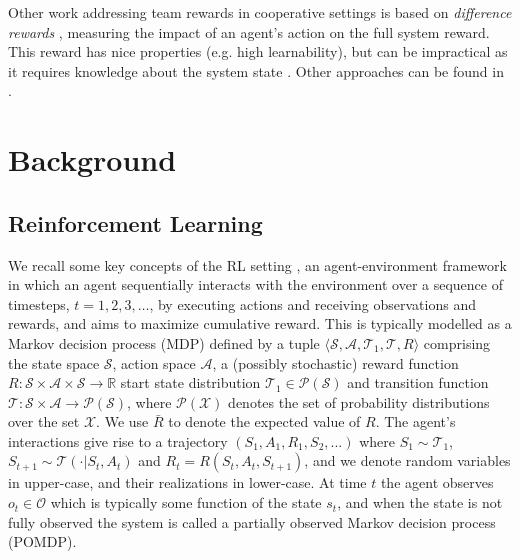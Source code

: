 \documentclass{article}
\begin{document}
Other work addressing team rewards in cooperative  settings is based on \textit{difference rewards} \citep{tumer-wolpert_cdcs04}, measuring the impact of an agent's action on the full system reward. This reward has nice properties (e.g. high learnability), but can be impractical as it requires knowledge about the system state \citep{tumer-colby_aamas16,tumer-agogino_jaamas08,tumer-proper_aamas12}. Other approaches can be found in \citet{tumer-devlin_aamas14,tumer-holmesparker_ker14,BabesCL08}.





\section{Background}


\subsection{Reinforcement Learning}


We recall some key concepts of the RL setting \citep{SB98}, an agent-environment framework \citep{RN10} in which an agent sequentially interacts with the environment over a sequence of timesteps, $t=1,2,3,\hdots $, by executing actions and receiving observations and rewards, and aims to maximize cumulative reward. This is typically modelled as a Markov decision process (MDP) \citep[e.g.][]{puterman} defined by a tuple $ \langle \mathcal{S,A},\mathcal{T}_1,\mathcal{T},R \rangle$ comprising the state space $\mathcal{S}$, action space $\mathcal{A}$, a (possibly stochastic) reward function $R : \mathcal{S \times A\times S }\to \mathbb{R}$ start state distribution $\mathcal{T}_1 \in \mathcal{P(S)}$ and transition function $\mathcal{T}:\mathcal{S\times A} \rightarrow \mathcal{P(S)}$, where $\mathcal{P(X)}$ denotes the set of probability distributions over the set $\mathcal{X}$. We use $\bar{R}$ to denote the expected value of $R$. The agent's interactions give rise to a trajectory $(S_1,A_1,R_1,S_2,...)$ where $S_{1}\sim \mathcal{T}_1$, $S_{t+1}\sim \mathcal{T}(\cdot|S_t,A_t)$ and $R_t = R(S_t,A_t,S_{t+1})$, and we denote random variables in upper-case, and their realizations in lower-case. At time $t$ the agent observes $ o_t\in\mathcal{O} $ which is typically some function of the state $s_t$, and when the state is not fully observed the system is called a partially observed Markov decision process (POMDP).

\iffalse
If the Markov property $$\Pr(o_t,r_t\ |\ a_1,o_1,r_1, \hdots, a_{t-1},o_{t-1},r_{t-1},a_t ) =$$ $$ \Pr(o_t,r_t\ |\ o_{t-1},a_t)$$ is satisfied, then the environment is called a Markov Decision Process (MDP) and the observations $o_t$ can be viewed as states $s_t$. It is always possible to trivially satisfy the Markov property by letting $$s_t=h_t=a_1o_1r_1,...,a_{t-1}o_{t-1}r_{t-1}$ and then $\Pr(s_t,r_t\ |\ a_1,o_1,r_1, \hdots, a_{t-1},o_{t-1},r_{t-1},a_t ) = \Pr(s_t,r_t\ |\ s_{t-1},a_t)$$.
\fi
\end{document}
